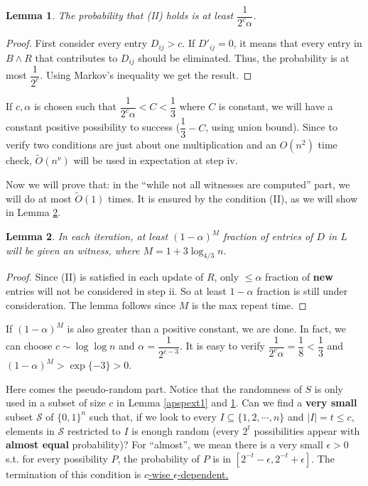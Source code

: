 \documentclass[11pt]{article}
\theoremstyle{plain}
\newtheorem{lemma}{Lemma}[section]
\begin{document}
\begin{lemma}
\label{apspext2}
The probability that (II) holds is at least $\dfrac{1}{2^c\alpha}$.
\end{lemma}

\begin{proof}
First consider every entry $D_{ij}>c$. If $D'_{ij}=0$, it means that every entry in $B\land R$ that contributes to $D_{ij}$ should be eliminated. Thus, the probability is at most $\dfrac{1}{2^c}$. Using Markov's inequality we get the result.
\end{proof}

If $c,\alpha$ is chosen such that $\dfrac{1}{2^c\alpha}<C<\dfrac{1}{3}$ where $C$ is constant, we will have a constant positive possibility to success ($\dfrac{1}{3}-C$, using union bound). Since to verify two conditions are just about one multiplication and an $O(n^2)$ time check, $\tilde O(n^\nu)$ will be used in expectation at step iv. 

Now we will prove that: in the ``while not all witnesses are computed'' part, we will do at most $\tilde O(1)$ times. It is ensured by the condition (II), as we will show in Lemma \ref{apspext3}.

\begin{lemma}
\label{apspext3}
In each iteration, at least $(1-\alpha)^{M}$ fraction of entries of $D$ in $L$ will be given an witness, where $M=1+3\log_{4/3} n$.
\end{lemma}

\begin{proof}
Since (II) is satisfied in each update of $R$, only $\le \alpha$ fraction of \textbf{new} entries will not be considered in step ii. So at least $1-\alpha$ fraction is still under consideration. The lemma follows since $M$ is the max repeat time.
\end{proof}

If $(1-\alpha)^M$ is also greater than a positive constant, we are done. In fact, we can choose $c\sim\log \log n$ and $\alpha=\dfrac{1}{2^{c-3}}$. It is easy to verify $\dfrac{1}{2^c\alpha}=\dfrac{1}{8}<\dfrac{1}{3}$ and $(1-\alpha)^M>\exp\{-3\}>0$.

Here comes the pseudo-random part. Notice that the randomness of $S$ is only used in a subset of size $c$ in Lemma \ref{apspext1} and \ref{apspext2}. Can we find a \textbf{very small} subset $\mathcal{S}$ of $\{0,1\}^n$ such that, if we look to every $I\subseteq\{1,2,\cdots,n\}$ and $|I|=t\le c$, elements in $\mathcal{S}$ restricted to $I$ is enough random (every $2^t$ possibilities appear with \textbf{almost equal} probability)? For ``almost'', we mean there is a very small $\epsilon>0$ s.t. for every possibility $P$, the probability of $P$ is in $[2^{-t}-\epsilon,2^{-t}+\epsilon]$. The termination of this condition is \underline{$c$-wise $\epsilon$-dependent.}
\end{document}

